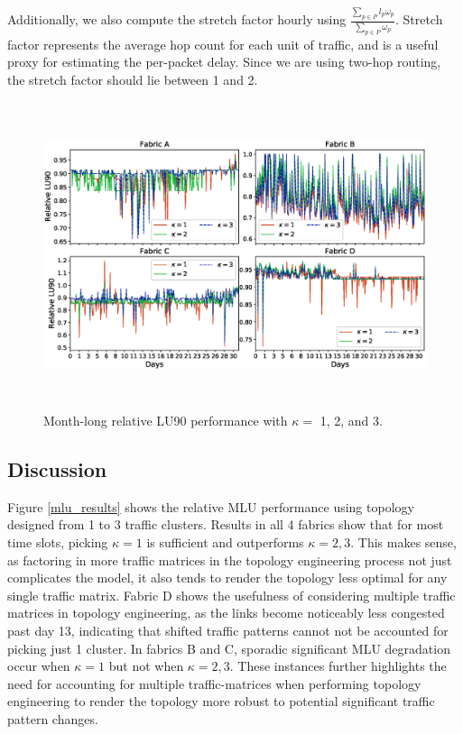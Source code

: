 \documentclass[sigconf]{acmart}
\theoremstyle{definition}
\begin{document}
Additionally, we also compute the stretch factor hourly using $\frac{\sum\limits_{p \in P}l_p \omega_p}{\sum \limits_{p \in P}\omega_p}$. Stretch factor represents the average hop count for each unit of traffic, and is a useful proxy for estimating the per-packet delay. Since we are using two-hop routing, the stretch factor should lie between 1 and 2.


\begin{figure}[t!]
\centering
\includegraphics[scale=1.2, width=\textwidth, height=9cm, trim={2cm 1.9cm 1cm 0.60cm}]{./figures/lu90}
\caption{Month-long relative LU90 performance with $\kappa = $ 1, 2, and 3.}
\label{lu90_results}
\end{figure}

\subsection{Discussion}
Figure \ref{mlu_results} shows the relative MLU performance using topology designed from 1 to 3 traffic clusters. Results in all 4 fabrics show that for most time slots, picking $\kappa = 1$ is sufficient and outperforms $\kappa = 2, 3$. This makes sense, as factoring in more traffic matrices in the topology engineering process not just complicates the model, it also tends to render the topology less optimal for any single traffic matrix. Fabric D shows the usefulness of considering multiple traffic matrices in topology engineering, as the links become noticeably less congested past day 13, indicating that shifted traffic patterns cannot not be accounted for picking just 1 cluster. In fabrics B and C, sporadic significant MLU degradation occur when $\kappa = 1$ but not when $\kappa = 2, 3$. These instances further highlights the need for accounting for multiple traffic-matrices when performing topology engineering to render the topology more robust to potential significant traffic pattern changes. 
\end{document}
